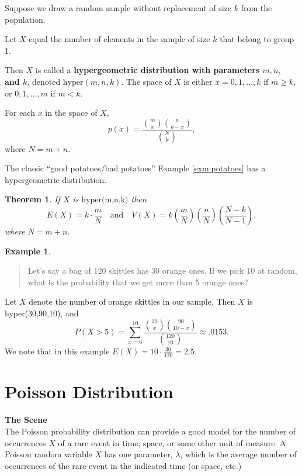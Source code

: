 \documentclass[
]{book}
\newtheorem{theorem}{Theorem}[chapter]
\theoremstyle{definition}
\theoremstyle{definition}
\newtheorem{example}{Example}[chapter]
\theoremstyle{definition}
\theoremstyle{definition}
\theoremstyle{remark}
\begin{document}
Suppose we draw a random sample without replacement of size \(k\) from the population.

Let \(X\) equal the number of elements in the sample of size \(k\) that belong to group 1.

Then \(X\) is called a \textbf{hypergeometric distribution with parameters \(m, n,\) and \(k\)}, denoted \(\text{hyper}(m,n,k)\). The space of \(X\) is either
\(x = 0, 1, \ldots, k\) if \(m \geq k\), or \(0, 1, \ldots, m\) if \(m < k\).

For each \(x\) in the space of \(X\),
\[p(x) = \frac{\binom{m}{x}\binom{n}{k-x}}{\binom{N}{k}},\] where \(N = m + n\).

The classic ``good potatoes/bad potatoes'' Example \ref{exm:potatoes} has a hypergeometric distribution.

\begin{theorem}
\protect\hypertarget{thm:hypergeometric-EandV}{}\label{thm:hypergeometric-EandV}If \(X\) is \(\text{hyper(m,n,k)}\) then \[E(X) = k\cdot\frac{m}{N}~~~\text{ and }~~~ V(X) = k \left(\frac{m}{N}\right)\left(\frac{n}{N}\right)\left(\frac{N-k}{N-1}\right),\] where \(N = m + n\).
\end{theorem}

\begin{example}
\protect\hypertarget{exm:hyper-skittles}{}\label{exm:hyper-skittles}\leavevmode

\begin{quote}
Let's say a bag of 120 skittles has 30 orange ones. If we pick 10 at random, what is the probability that we get more than 5 orange ones?
\end{quote}

Let \(X\) denote the number of orange skittles in our sample. Then \(X\) is hyper(30,90,10), and
\[P(X>5) = \sum_{x=6}^{10} \frac{\binom{30}{x}\binom{90}{10-x}}{\binom{120}{10}} \approx .0153.\]
We note that in this example \(E(X) = 10 \cdot \frac{30}{120} = 2.5.\)

\end{example}

\section{Poisson Distribution}\label{poisson}

\textbf{The Scene}\\
The Poisson probability distribution can provide a good model for the number of occurrences \(X\) of a rare event in time, space, or some other unit of measure. A Poisson random variable \(X\) has one parameter, \(\lambda\), which is the average number of occurrences of the rare event in the indicated time (or space, etc.)
\end{document}
